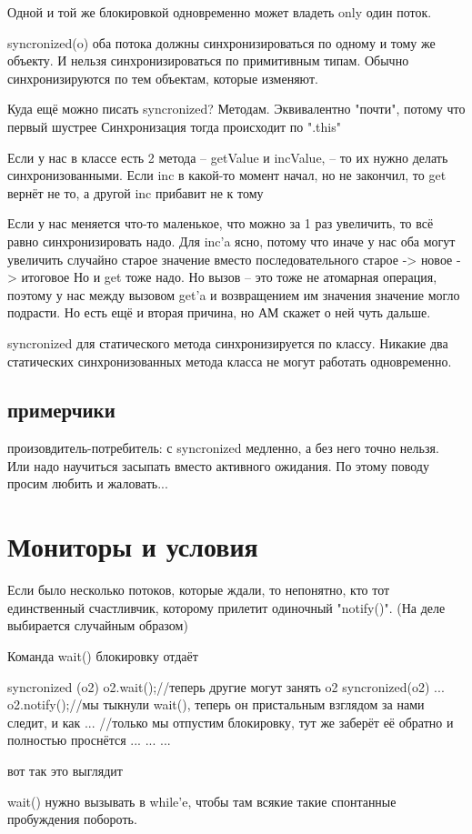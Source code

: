 Одной и той же блокировкой одновременно может владеть only один поток.

syncronized(o) {}
оба потока должны синхронизироваться по одному и тому же объекту. И нельзя синхронизироваться по примитивным типам.
Обычно синхронизируются по тем объектам, которые изменяют.

Куда ещё можно писать syncronized? Методам.
Эквивалентно "почти", потому что первый шустрее
Синхронизация тогда происходит по \java".this"

Если у нас в классе есть 2 метода -- getValue и incValue, -- то их нужно делать синхронизованными.
Если inc  в какой-то момент начал, но не закончил, то get вернёт не то, а другой inc прибавит не к тому

Если у нас меняется что-то маленькое, что можно за 1 раз увеличить, то всё равно синхронизировать надо.
Для inc'a ясно, потому что иначе у нас оба могут увеличить случайно старое значение вместо последовательного старое -> новое -> итоговое
Но и get тоже надо. Но вызов -- это тоже не атомарная операция, поэтому у нас между вызовом get'a и возвращением им значения
значение могло подрасти.
Но есть ещё и вторая причина, но АМ скажет о ней чуть дальше.

syncronized для статического метода синхронизируется по классу. Никакие два статических синхронизованных метода класса не могут
работать одновременно.

\section{примерчики}
произовдитель-потребитель: с syncronized медленно, а без него точно нельзя. Или надо научиться засыпать вместо активного ожидания.
По этому поводу просим любить и жаловать...

\chapter{Мониторы и условия}
Если было несколько потоков, которые ждали, то непонятно, кто тот единственный счастливчик, которому прилетит одиночный \java"notify()".
(На деле выбирается случайным образом)

Команда wait() блокировку отдаёт
\begin{javacode}
syncronized (o2) {
	o2.wait();//теперь другие могут занять o2
					syncronized(o2) {
						...
						o2.notify();//мы тыкнули wait(), теперь он пристальным взглядом за нами следит, и как
						...	    //только мы отпустим блокировку, тут же заберёт её обратно и полностью проснётся
						...	    %
					}
	...
	...
}
\end{javacode}
вот так это выглядит

wait() нужно вызывать в while'e, чтобы там всякие такие спонтанные пробуждения побороть.

